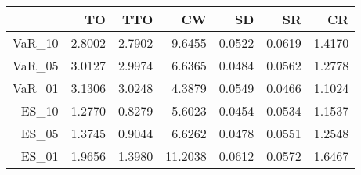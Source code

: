 \begin{tabular}{rrrrrrr}
  \toprule
 & TO & TTO & CW & SD & SR & CR \\ 
  \midrule
VaR\_10 & 2.8002 & 2.7902 & 9.6455 & 0.0522 & 0.0619 & 1.4170 \\ 
  VaR\_05 & 3.0127 & 2.9974 & 6.6365 & 0.0484 & 0.0562 & 1.2778 \\ 
  VaR\_01 & 3.1306 & 3.0248 & 4.3879 & 0.0549 & 0.0466 & 1.1024 \\ 
  ES\_10 & 1.2770 & 0.8279 & 5.6023 & 0.0454 & 0.0534 & 1.1537 \\ 
  ES\_05 & 1.3745 & 0.9044 & 6.6262 & 0.0478 & 0.0551 & 1.2548 \\ 
  ES\_01 & 1.9656 & 1.3980 & 11.2038 & 0.0612 & 0.0572 & 1.6467 \\ 
   \bottomrule
\end{tabular}
